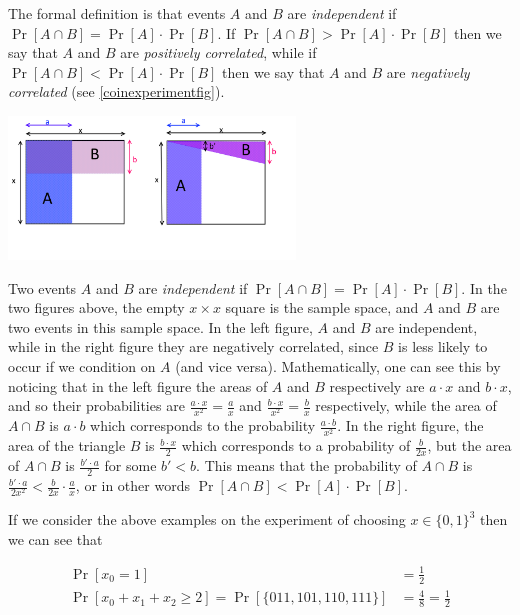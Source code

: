The formal definition is that events \(A\) and \(B\) are
\emph{independent} if \(\Pr[A \cap B]=\Pr[A] \cdot \Pr[B]\). If
\(\Pr[A \cap B] > \Pr[A]\cdot \Pr[B]\) then we say that \(A\) and \(B\)
are \emph{positively correlated}, while if
\(\Pr[ A \cap B] < \Pr[A] \cdot \Pr[B]\) then we say that \(A\) and
\(B\) are \emph{negatively correlated} (see \cref{coinexperimentfig}).

\begin{marginfigure}
\centering
\includegraphics[width=\linewidth, height=1.5in, keepaspectratio]{../figure/independence.png}
\caption{Two events \(A\) and \(B\) are \emph{independent} if
\(\Pr[A \cap B]=\Pr[A]\cdot \Pr[B]\). In the two figures above, the
empty \(x\times x\) square is the sample space, and \(A\) and \(B\) are
two events in this sample space. In the left figure, \(A\) and \(B\) are
independent, while in the right figure they are negatively correlated,
since \(B\) is less likely to occur if we condition on \(A\) (and vice
versa). Mathematically, one can see this by noticing that in the left
figure the areas of \(A\) and \(B\) respectively are \(a\cdot x\) and
\(b\cdot x\), and so their probabilities are
\(\tfrac{a\cdot x}{x^2}=\tfrac{a}{x}\) and
\(\tfrac{b\cdot x}{x^2}=\tfrac{b}{x}\) respectively, while the area of
\(A \cap B\) is \(a\cdot b\) which corresponds to the probability
\(\tfrac{a\cdot b}{x^2}\). In the right figure, the area of the triangle
\(B\) is \(\tfrac{b\cdot x}{2}\) which corresponds to a probability of
\(\tfrac{b}{2x}\), but the area of \(A \cap B\) is
\(\tfrac{b' \cdot a}{2}\) for some \(b'<b\). This means that the
probability of \(A \cap B\) is
\(\tfrac{b'\cdot a}{2x^2} < \tfrac{b}{2x} \cdot \tfrac{a}{x}\), or in
other words \(\Pr[A \cap B ] < \Pr[A] \cdot \Pr[B]\).}
\label{independencefig}
\end{marginfigure}

If we consider the above examples on the experiment of choosing
\(x\in \{0,1\}^3\) then we can see that

\begin{equation*}
\begin{aligned}
\Pr[x_0=1] &= \tfrac{1}{2} \\
\Pr[x_0+x_1+x_2 \geq 2] = \Pr[\{ 011,101,110,111 \}] &= \tfrac{4}{8} = \tfrac{1}{2}
\end{aligned}
\end{equation*}

